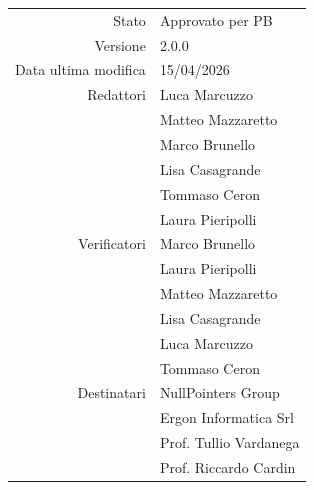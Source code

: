 \begin{center}
\begin{tabular}{r|l}
    Stato & Approvato per PB \\[0.5em]
    Versione & 2.0.0 \\[0.5em]
    Data ultima modifica & 15/04/2026 \\[0.5em]
    Redattori & Luca Marcuzzo \\
              & Matteo Mazzaretto \\
              & Marco Brunello \\
              & Lisa Casagrande \\
              & Tommaso Ceron \\
              & Laura Pieripolli \\[0.5em]
    Verificatori & Marco Brunello \\
                 & Laura Pieripolli \\
                 & Matteo Mazzaretto \\
                 & Lisa Casagrande \\
                 & Luca Marcuzzo\\ 
                 & Tommaso Ceron \\ [0.5em]
    Destinatari & NullPointers Group \\
    & Ergon Informatica Srl \\
    & Prof. Tullio Vardanega \\
    & Prof. Riccardo Cardin \\
\end{tabular}
\end{center}